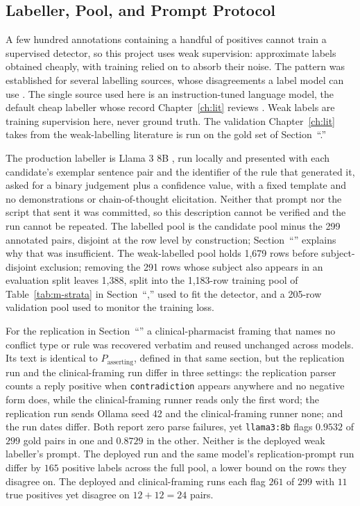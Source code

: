 \subsection{Labeller, Pool, and Prompt Protocol}

A few hundred annotations containing a handful of positives cannot train a supervised
detector, so this project uses weak supervision: approximate labels obtained cheaply, with
training relied on to absorb their noise. The pattern was established for several labelling sources, whose disagreements a label model can use \citep{ratner2017snorkel}. The
single source used here is an instruction-tuned language model, the default cheap labeller whose
record Chapter~\ref{ch:lit} reviews \citep{gilardi2023chatgpt}. Weak labels are training supervision here, never ground truth. The validation Chapter~\ref{ch:lit} takes from the weak-labelling literature \citep{pangakis2023validation} is run on the gold set of Section~``.''

The production labeller is Llama 3 8B \citep{grattafiori2024llama3}, run locally and presented with
each candidate's exemplar sentence pair and the identifier of the rule that generated it, asked for
a binary judgement plus a confidence value, with a fixed template and no demonstrations or
chain-of-thought elicitation. Neither that prompt nor the script that sent it was committed, so this description cannot be verified and the run cannot be repeated. The labelled pool is the candidate pool minus the 299 annotated pairs, disjoint at
the row level by construction; Section~``'' explains why that was insufficient.
The weak-labelled pool holds 1,679 rows before subject-disjoint exclusion; removing the 291 rows
whose subject also appears in an evaluation split leaves 1,388, split into the 1,183-row training
pool of Table~\ref{tab:m-strata} in Section~``,'' used to fit the detector, and a 205-row validation pool used to monitor the training loss.

For the replication in Section~``'' a clinical-pharmacist framing that
names no conflict type or rule was recovered verbatim and reused unchanged across models. Its text
is identical to $P_{\text{asserting}}$, defined in that same section, but the replication run and the clinical-framing run differ
in three settings: the replication parser counts a reply positive when
\texttt{contradiction} appears anywhere and no negative form does, while the clinical-framing runner
reads only the first word; the replication run sends Ollama seed 42 and the clinical-framing runner
none; and the run dates differ. Both report zero parse failures, yet
\texttt{llama3:8b} flags $0.9532$ of $299$ gold pairs in one and $0.8729$ in the other. Neither is
the deployed weak labeller's prompt. The deployed run and the same model's replication-prompt run
differ by $165$ positive labels across the full pool, a lower bound on the rows they disagree on.
The deployed and clinical-framing runs each flag $261$ of $299$ with $11$ true positives yet
disagree on $12 + 12 = 24$ pairs.

